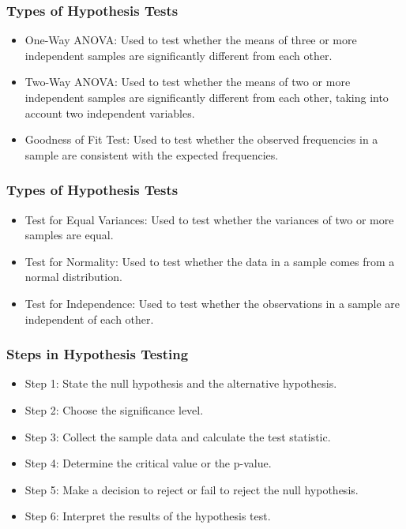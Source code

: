 \documentclass[serif, 9pt, aspectratio=32]{beamer}
\begin{document}
\begin{frame}
    \frametitle{Types of Hypothesis Tests}
    \begin{itemize}
        \setlength{\itemsep}{2em}
        \item One-Way ANOVA: Used to test whether the means of three or more independent samples are significantly different from each other.
        \item Two-Way ANOVA: Used to test whether the means of two or more independent samples are significantly different from each other, taking into account two independent variables.
        \item Goodness of Fit Test: Used to test whether the observed frequencies in a sample are consistent with the expected frequencies.
    \end{itemize}
\end{frame}

\begin{frame}
    \frametitle{Types of Hypothesis Tests}
    \begin{itemize}
        \setlength{\itemsep}{2em}
        \item Test for Equal Variances: Used to test whether the variances of two or more samples are equal.
        \item Test for Normality: Used to test whether the data in a sample comes from a normal distribution.
        \item Test for Independence: Used to test whether the observations in a sample are independent of each other.
    \end{itemize}
\end{frame}

\begin{frame}
    \frametitle{Steps in Hypothesis Testing}
    \begin{itemize}
        \setlength{\itemsep}{2em}
        \item Step 1: State the null hypothesis and the alternative hypothesis.
        \item Step 2: Choose the significance level.
        \item Step 3: Collect the sample data and calculate the test statistic.
        \item Step 4: Determine the critical value or the p-value.
        \item Step 5: Make a decision to reject or fail to reject the null hypothesis.
        \item Step 6: Interpret the results of the hypothesis test.
    \end{itemize}
\end{frame}
\end{document}
